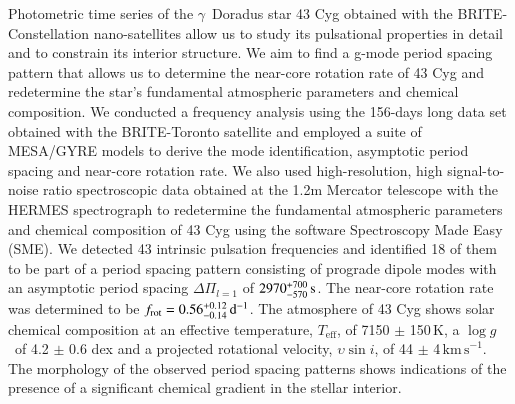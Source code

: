 \documentclass{aa}
\def\gdor{$\gamma$~Doradus }
\def\Teff{\ensuremath{T_{\mathrm{eff}}}}
\def\logg{\ensuremath{\log g}}
\def\vsini{\ensuremath{{\upsilon}\sin i}}
\def\kms{$\mathrm{km\,s}^{-1}$}
\begin{document}
  \abstract
   {Photometric time series of the \gdor star 43 Cyg obtained with the BRITE-Constellation nano-satellites allow us to study its pulsational properties in detail and to constrain its interior structure.}
   {We aim to find a g-mode period spacing pattern that allows us to determine the near-core rotation rate of 43 Cyg and redetermine the star's fundamental atmospheric parameters and chemical composition. }
   {We conducted a frequency analysis using the 156-days long data set obtained with the BRITE-Toronto satellite and employed a suite of MESA/GYRE models to derive the mode identification, asymptotic period spacing and near-core rotation rate. We also used high-resolution, high signal-to-noise ratio spectroscopic data obtained at the 1.2m Mercator telescope with the HERMES spectrograph to redetermine the fundamental atmospheric parameters and chemical composition of 43 Cyg using the software Spectroscopy Made Easy (SME).}
   {We detected 43 intrinsic pulsation frequencies and identified 18 of them to be part of a period spacing pattern consisting of prograde dipole modes with an asymptotic period spacing $\Delta \Pi_{l=1}$ of $2970^{+700}_{-570}\,\rm s$. The near-core rotation rate was determined to be $f_{\rm rot} = 0.56^{+0.12}_{-0.14}\,\rm d^{-1}$. The atmosphere of 43 Cyg shows solar chemical composition at an effective temperature, \Teff, of 7150 $\pm$ 150\,K, a \logg\ of 4.2 $\pm$ 0.6 dex and a projected rotational velocity, \vsini, of 44 $\pm$ 4\,\kms. }
   {The morphology of the observed period spacing patterns shows indications of the presence of a significant chemical gradient in the stellar interior.}
  


   \maketitle

%
\end{document}
